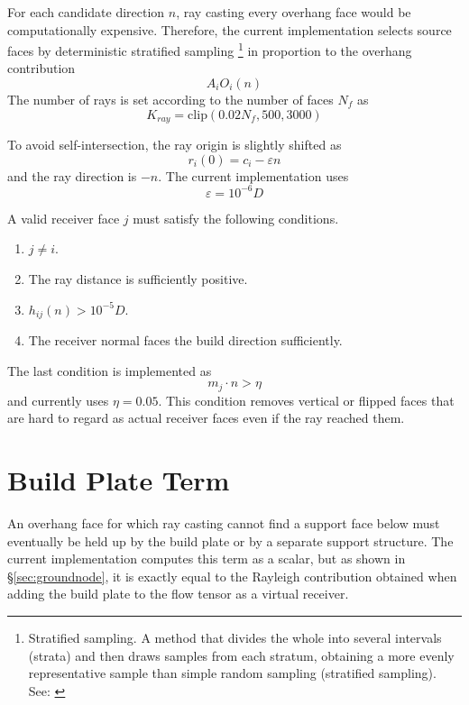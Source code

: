 \documentclass[11pt,a4paper]{article}
\begin{document}
For each candidate direction $n$, ray casting every overhang face would be computationally expensive.
Therefore, the current implementation selects source faces by deterministic stratified sampling%
\footnote{Stratified sampling. A method that divides the whole into several intervals (strata) and then draws samples from each stratum,
obtaining a more evenly representative sample than simple random sampling (stratified sampling). See: \cite{cochran1977}}
in proportion to the overhang contribution
\begin{equation}
A_iO_i(n)
\end{equation}
The number of rays is set according to the number of faces $N_f$ as
\begin{equation}
K_{ray}
=
\mathrm{clip}(0.02N_f,500,3000)
\label{eq:kray-budget}
\end{equation}

To avoid self-intersection, the ray origin is slightly shifted as
\begin{equation}
r_i(0)=c_i-\varepsilon n
\end{equation}
and the ray direction is $-n$.
The current implementation uses
\begin{equation}
\varepsilon = 10^{-6}D
\end{equation}

A valid receiver face $j$ must satisfy the following conditions.

\begin{enumerate}
\item $j\ne i$.
\item The ray distance is sufficiently positive.
\item $h_{ij}(n)>10^{-5}D$.
\item The receiver normal faces the build direction sufficiently.
\end{enumerate}

The last condition is implemented as
\begin{equation}
m_j\cdot n > \eta
\end{equation}
and currently uses $\eta=0.05$.
This condition removes vertical or flipped faces that are hard to regard as actual receiver faces even if the ray reached them.

\section{Build Plate Term}

An overhang face for which ray casting cannot find a support face below must eventually be held up by the build plate or by a separate support structure.
The current implementation computes this term as a scalar, but
as shown in \S\ref{sec:groundnode}, it is exactly equal to the Rayleigh contribution obtained when adding the build plate to the flow tensor as a virtual receiver.
\end{document}
